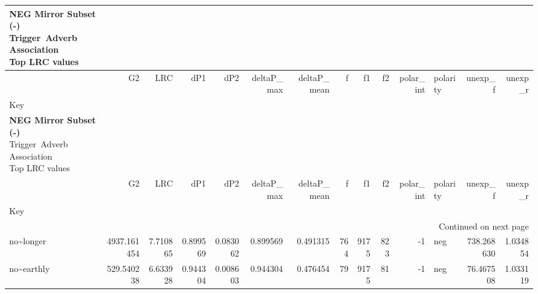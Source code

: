 
\begin{longtable}[ht]{lrrrrrrrrrrlrr}
\caption{\textbf{NEG Mirror Subset (-)}\\Trigger~Adverb Association\\Top LRC values} \label{trig-adv-AMtop-NEGMir} \\
\toprule
 & G2 & LRC & dP1 & dP2 & deltaP\_max & deltaP\_mean & f & f1 & f2 & polar\_int & polarity & unexp\_f & unexp\_r \\
Key &  &  &  &  &  &  &  &  &  &  &  &  &  \\
\midrule
\endfirsthead
\caption[]{\textbf{NEG Mirror Subset (-)}\\Trigger~Adverb Association\\Top LRC values} \\
\toprule
 & G2 & LRC & dP1 & dP2 & deltaP\_max & deltaP\_mean & f & f1 & f2 & polar\_int & polarity & unexp\_f & unexp\_r \\
Key &  &  &  &  &  &  &  &  &  &  &  &  &  \\
\midrule
\endhead
\midrule
\multicolumn{14}{r}{Continued on next page} \\
\midrule
\endfoot
\bottomrule
\endlastfoot
no\textasciitilde longer & {\cellcolor[HTML]{E157A7}} \color[HTML]{F1F1F1} 4937.161454 & {\cellcolor[HTML]{67001F}} \color[HTML]{F1F1F1} 7.710865 & {\cellcolor[HTML]{840034}} \color[HTML]{F1F1F1} 0.899569 & {\cellcolor[HTML]{CEA6D0}} \color[HTML]{000000} 0.083062 & {\cellcolor[HTML]{8A0039}} \color[HTML]{F1F1F1} 0.899569 & {\cellcolor[HTML]{67001F}} \color[HTML]{F1F1F1} 0.491315 & {\cellcolor[HTML]{D0ADD4}} \color[HTML]{000000} 764 & {\cellcolor[HTML]{EDE9F3}} \color[HTML]{000000} 9175 & {\cellcolor[HTML]{E1D4E8}} \color[HTML]{000000} 823 & {\cellcolor[HTML]{F7F4F9}} \color[HTML]{000000} -1 & neg & {\cellcolor[HTML]{CB99CA}} \color[HTML]{F1F1F1} 738.268630 & {\cellcolor[HTML]{F1EDF6}} \color[HTML]{000000} 1.034854 \\
no\textasciitilde earthly & {\cellcolor[HTML]{F1EDF5}} \color[HTML]{000000} 529.540238 & {\cellcolor[HTML]{CD1256}} \color[HTML]{F1F1F1} 6.633928 & {\cellcolor[HTML]{700026}} \color[HTML]{F1F1F1} 0.944304 & {\cellcolor[HTML]{F4F0F7}} \color[HTML]{000000} 0.008603 & {\cellcolor[HTML]{730028}} \color[HTML]{F1F1F1} 0.944304 & {\cellcolor[HTML]{76002A}} \color[HTML]{F1F1F1} 0.476454 & {\cellcolor[HTML]{F4F0F7}} \color[HTML]{000000} 79 & {\cellcolor[HTML]{EDE9F3}} \color[HTML]{000000} 9175 & {\cellcolor[HTML]{F5F2F8}} \color[HTML]{000000} 81 & {\cellcolor[HTML]{F7F4F9}} \color[HTML]{000000} -1 & neg & {\cellcolor[HTML]{F3EFF6}} \color[HTML]{000000} 76.467508 & {\cellcolor[HTML]{F2EEF6}} \color[HTML]{000000} 1.033119 \\

\end{longtable}
